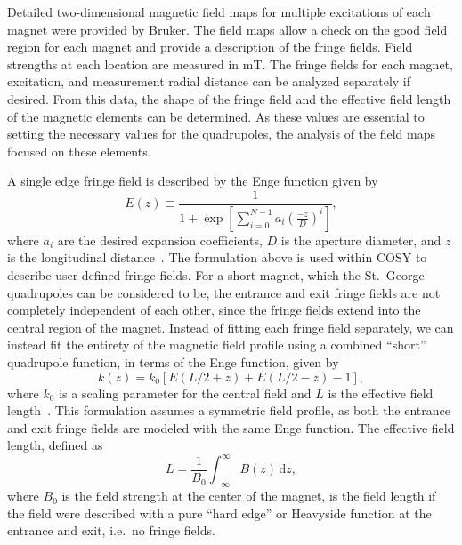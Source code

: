 Detailed two-dimensional magnetic field maps for multiple excitations of each
magnet were provided by Bruker. The field maps allow a check on the good field
region for each magnet and provide a description of the fringe fields. Field
strengths at each location are measured in mT. The fringe fields for each
magnet, excitation, and measurement radial distance can be analyzed separately
if desired. From this data, the shape of the fringe field and the effective
field length of the magnetic elements can be determined. As these values are
essential to setting the necessary values for the quadrupoles, the analysis of
the field maps focused on these elements.

A single edge fringe field is described by the Enge function given by
\begin{equation}
    \label{eq:enge}
    E(z) \equiv \frac{1}{1 +
        \exp\left[\sum_{i=0}^{N-1}{a_i}(\frac{-z}{D})^{i}\right]},
\end{equation}
where $a_i$ are the desired expansion coefficients, $D$ is the aperture
diameter, and $z$ is the longitudinal distance~\cite{Baartman2007}. The
formulation above is used within COSY to describe user-defined fringe fields.
For a short magnet, which the St.\ George quadrupoles can be considered to be,
the entrance and exit fringe fields are not completely independent of each
other, since the fringe fields extend into the central region of the magnet.
Instead of fitting each fringe
field separately, we can instead fit the entirety of the magnetic field
profile using a combined ``short'' quadrupole function, in terms of the Enge
function, given by
\begin{equation}
    \label{eq:shortquad}
    k(z) = k_0\left[E(L/2 + z) + E(L/2 - z) - 1\right],
\end{equation}
where $k_0$ is a scaling parameter for the central field and $L$ is the
effective field length~\cite{Baartman2007}. This formulation assumes a
symmetric field profile, as both the entrance and exit fringe fields are
modeled with the same Enge function. The effective field length, defined as
\begin{equation}
    \label{eq:efl}
    L = \frac{1}{B_0}\int_{-\infty}^{\infty} B(z)\, \textrm{d}z,
\end{equation}
where $B_0$ is the field strength at the center of the magnet,
is the field length if the field were described with a pure ``hard edge'' or
Heavyside function at the entrance and exit, i.e.\ no fringe fields.

